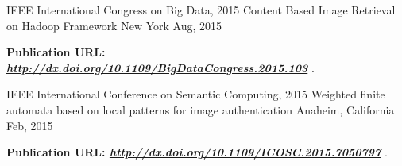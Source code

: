 

\begin{cventries}

  \cventry
    {IEEE International Congress on Big Data, 2015} %
    {Content Based Image Retrieval on Hadoop Framework} %
    {New York} %
    {Aug, 2015} %
    {
      \begin{cvitems} %
        \item {\textbf{Publication URL: \textit{\textbf{\url{http://dx.doi.org/10.1109/BigDataCongress.2015.103}}}} .}
      \end{cvitems}
    }

  \cventry
    {IEEE International Conference on Semantic Computing, 2015} %
    {Weighted finite automata based on local patterns for image authentication} %
    {Anaheim, California} %
    {Feb, 2015} %
    {
      \begin{cvitems} %
        \item {\textbf{Publication URL: \textit{\textbf{\url{http://dx.doi.org/10.1109/ICOSC.2015.7050797}}}} .}
      \end{cvitems}
    }

\end{cventries}


